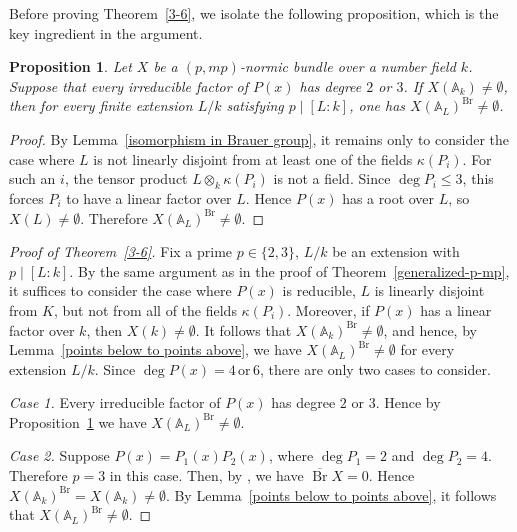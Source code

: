 \documentclass[10pt]{amsart}
\theoremstyle{plain}
\newtheorem{proposition}[thm]{Proposition}
\theoremstyle{definition}
\newcommand{\A}{{\mathbb A}}
\newcommand{\Br}{\operatorname{Br}}
\begin{document}
Before proving Theorem~\ref{3-6}, we isolate the following proposition, which is the key ingredient in the argument.

\begin{proposition}\label{quadratic-cubic-factors}
Let \(X\) be a \((p,mp)\)-normic bundle over a number field \(k\). Suppose that
every irreducible factor of \(P(x)\) has degree \(2\) or \(3\). If
\(X(\mathbb{A}_k)\neq\emptyset\), then for every finite extension \(L/k\)
satisfying \(p\mid [L:k]\), one has
\(X(\mathbb{A}_L)^{\Br}\neq\emptyset\).
\end{proposition}

\begin{proof}
By Lemma~\ref{isomorphism in Brauer group}, it remains only to consider the
case where \(L\) is not linearly disjoint from at least one of the fields
\(\kappa(P_i)\). For such an \(i\), the tensor product
\(L\otimes_k\kappa(P_i)\) is not a field. Since \(\deg P_i\leq 3\), this forces
\(P_i\) to have a linear factor over \(L\). Hence \(P(x)\) has a root over
\(L\), so \(X(L)\neq\emptyset\). Therefore
\(X(\mathbb{A}_L)^{\Br}\neq\emptyset\).
\end{proof}

\begin{proof}[Proof of Theorem~\ref{3-6}]
Fix a prime $p\in\{2,3\}$, $L/k$ be an extension with $p\mid[L:k]$. By the same argument as in the proof of Theorem~\ref{generalized-p-mp}, it suffices to consider the case where $P(x)$ is reducible, $L$ is linearly disjoint from $K$, but not from all of the fields $\kappa(P_i)$. Moreover, if \(P(x)\) has a linear factor over \(k\), then \(X(k)\neq\emptyset\). It follows that \(X(\mathbb{A}_k)^{\Br}\neq\emptyset\), and hence, by Lemma~\ref{points below to points above}, we have \(X(\mathbb{A}_L)^{\Br}\neq\emptyset\) for every extension \(L/k\). Since \(\deg P(x)= 4\, \text{or}\,6\), there are only two cases to consider.

\noindent\emph{Case 1.} Every irreducible factor of $P(x)$ has degree $2$ or $3$. Hence by Proposition~\ref{quadratic-cubic-factors} we have $X(\A_L)^{\Br}\neq\emptyset$.


\noindent\textit{Case 2.} Suppose \(P(x)=P_1(x)P_2(x)\), where \(\deg P_1=2\) and \(\deg P_2=4\). Therefore $p=3$ in this case. Then, by \cite[Corollary 3.3]{AVB}, we have \(\overline{\Br} X=0\). Hence \(X(\mathbb{A}_k)^{\Br}=X(\mathbb{A}_k)\neq\emptyset\). By Lemma~\ref{points below to points above}, it follows that \(X(\mathbb{A}_L)^{\Br}\neq\emptyset\).
\end{proof}
\end{document}
